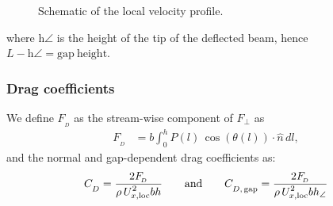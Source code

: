 \documentclass[preprint, letterpaper, nobibnotes, aps, superscriptaddress,prb]{revtex4-1}
\newcommand{\subscrm}[1]{_{{\textstyle\mathstrut}#1}}
\newcommand{\subscin}[2]{_{{#1},\,\mathrm{{\textstyle\mathstrut}#2}}}
\newcommand{\ffrac}[2]{\ensuremath{\frac{\displaystyle #1}{\displaystyle #2}}}
\begin{document}
\begin{figure}[h]
\centering {}
\caption{Schematic of the local velocity profile.}\protect\label{fig:v_loc} 
\end{figure}


where $\mathrm{h\angle}$ is the height of the tip of the deflected beam, hence $L-\mathrm{h\angle}=\mathrm{gap \ height}$.

\subsubsection{Drag coefficients}

We define $F_{_{\!D}}$ as the stream-wise component of $F_{\perp}$ as
\begin{align}
F_{_{\!D}} &= b\int_{0}^{h}P(l)\,\cos(\theta(l))\cdot\hat{n}\,dl,
\end{align}
and the normal and gap-dependent drag coefficients as:
\begin{align}
C\subscrm{D} = \ffrac{2F_{_{\!D}}}{\rho\,U^2_{x,\mathrm{loc}}bh} \quad\quad \mathrm{and} \quad\quad C\subscin{D}{gap} = \ffrac{2F_{_{\!D}}}{\rho\,U^2_{x,\mathrm{loc}}bh_{\angle}}
\end{align}

% 
\end{document}
